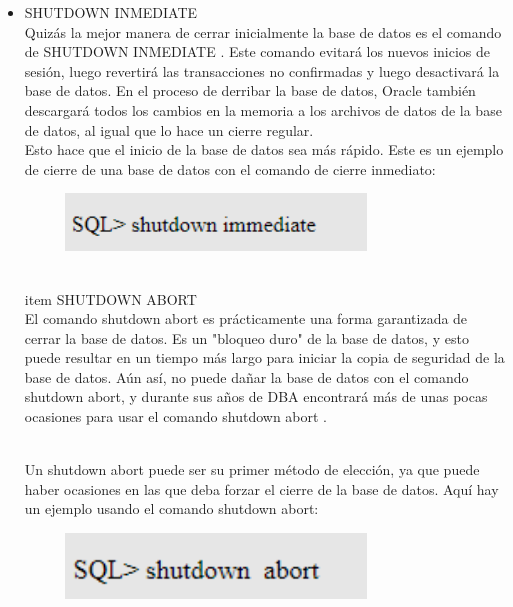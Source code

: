 \begin{itemize}
          \item SHUTDOWN INMEDIATE
	       \\Quizás la mejor manera de cerrar inicialmente la base de datos es el comando de SHUTDOWN INMEDIATE . Este comando evitará los nuevos inicios de sesión, luego revertirá las transacciones no confirmadas y luego desactivará la base de datos. En el proceso de derribar la base de datos, Oracle también descargará todos los cambios en la memoria a los archivos de datos de la base de datos, al igual que lo hace un cierre regular.
                  \\ Esto hace que el inicio de la base de datos sea más rápido.
 Este es un ejemplo de cierre de una base de datos con el comando de cierre inmediato:
                      \begin{figure}[htb]
                      \begin{center}
                      \includegraphics[width=8cm]{./Imagenes/shutdown_inmediate}
                      \end{center}
                      \end{figure}


        \\item SHUTDOWN ABORT
                   \\El comando shutdown abort es prácticamente una forma garantizada de cerrar la base de datos. Es un "bloqueo duro" de la base de datos, y esto puede resultar en un tiempo más largo para iniciar la copia de seguridad de la base de datos. Aún así, no puede dañar la base de datos con el comando shutdown abort, y durante sus años de DBA encontrará más de unas pocas ocasiones para usar el comando shutdown abort .

                     \\Un shutdown abort  puede ser su primer método de elección, ya que puede haber ocasiones en las que deba forzar el cierre de la base de datos. Aquí hay un ejemplo usando el comando shutdown abort:

                      \begin{figure}[htb]
                      \begin{center}
                      \includegraphics[width=8cm]{./Imagenes/shutdown_abort}
                      \end{center}
                      \end{figure}



\end{itemize} 